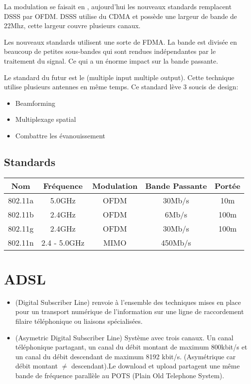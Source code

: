 La modulation se faisait en , aujourd'hui les nouveaux standards remplacent DSSS par OFDM. DSSS utilise du CDMA et possède une largeur de bande de 22Mhz, cette largeur couvre plusieurs canaux.

Les nouveaux standards  utilisent une sorte de FDMA. La bande est divisée en beaucoup de petites sous-bandes qui sont rendues indépendantes par le traitement du signal. Ce qui a un énorme impact sur la bande passante.

Le standard du futur est le  (multiple input multiple output). Cette technique utilise plusieurs antennes en même temps. Ce standard lève 3 soucis de design:
\begin{itemize}
\item Beamforming
\item Multiplexage spatial
\item Combattre les évanouissement
\end{itemize}

\section{Standards}
\begin{center}
\begin{tabular}{ccccc}
Nom & Fréquence & Modulation & Bande Passante & Portée\\
\hline
802.11a & 5.0GHz & OFDM & 30Mb/s & 10m\\
802.11b & 2.4GHz & OFDM & 6Mb/s & 100m\\
802.11g & 2.4GHz & OFDM & 30Mb/s & 100m\\
802.11n & 2.4 - 5.0GHz& MIMO & 450Mb/s & \\
\hline
\end{tabular}
\end{center}

\chapter{ADSL}

\begin{itemize}
\item {} (Digital Subscriber Line) renvoie à l'ensemble des techniques mises en place pour un transport numérique de l'information sur une ligne de raccordement filaire téléphonique ou liaisons spécialisées.

\item {} (Asymetric Digital Subscriber Line) Système avec trois canaux. Un canal téléphonique partagant, un canal du débit montant de maximum 800kbit/s et un canal du débit descendant de maximum 8192 kbit/s. (Asymétrique car débit montant $\neq$ descendant).Le download et upload partagent une même bande de fréquence parallèle au POTS (Plain Old Telephone System).
\end{itemize}

